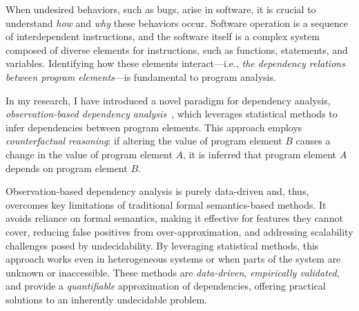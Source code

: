 \documentclass{article}
\begin{document}
When undesired behaviors, such as bugs, arise in software, it is crucial to understand \emph{how} and \emph{why} these behaviors occur. Software operation is a sequence of interdependent instructions, and the software itself is a complex system composed of diverse elements for instructions, such as functions, statements, and variables. Identifying how these elements interact—i.e., \emph{the dependency relations between program elements}—is fundamental to program analysis.

In my research, I have introduced a novel paradigm for dependency analysis, \emph{observation-based dependency analysis}~\cite{leeEvaluatingLexicalApproximation2020,leeObservationbasedApproximateDependency2021,leeCausalProgramDependence2025a}, which leverages statistical methods to infer dependencies between program elements. This approach employs \emph{counterfactual reasoning}: if altering the value of program element $B$ causes a change in the value of program element $A$, it is inferred that program element $A$ depends on program element $B$.


Observation-based dependency analysis is purely data-driven and, thus, overcomes key limitations of traditional formal semantics-based methods. It avoids reliance on formal semantics, making it effective for features they cannot cover, reducing false positives from over-approximation, and addressing scalability challenges posed by undecidability. By leveraging statistical methods, this approach works even in heterogeneous systems or when parts of the system are unknown or inaccessible. These methods are \emph{data-driven}, \emph{empirically validated}, and provide a \emph{quantifiable} approximation of dependencies, offering practical solutions to an inherently undecidable problem.
\end{document}
